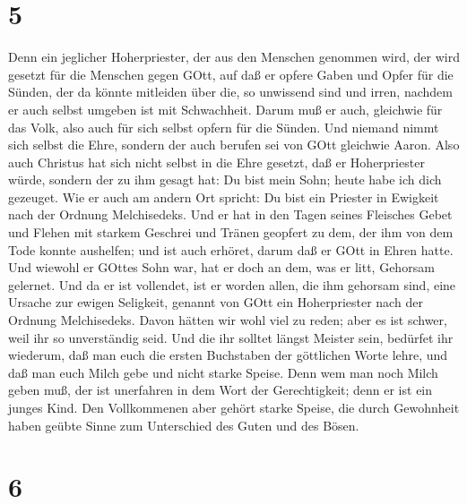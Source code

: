 \hypertarget{section-3}{%
\section{5}\label{section-3}}

 Denn ein jeglicher Hoherpriester, der aus den Menschen
genommen wird, der wird gesetzt für die Menschen gegen GOtt, auf daß er
opfere Gaben und Opfer für die Sünden,  der da könnte
mitleiden über die, so unwissend sind und irren, nachdem er auch selbst
umgeben ist mit Schwachheit.  Darum muß er auch, gleichwie
für das Volk, also auch für sich selbst opfern für die Sünden.
 Und niemand nimmt sich selbst die Ehre, sondern der auch
berufen sei von GOtt gleichwie Aaron.  Also auch Christus
hat sich nicht selbst in die Ehre gesetzt, daß er Hoherpriester würde,
sondern der zu ihm gesagt hat: Du bist mein Sohn; heute habe ich dich
gezeuget.  Wie er auch am andern Ort spricht: Du bist ein
Priester in Ewigkeit nach der Ordnung Melchisedeks.  Und er
hat in den Tagen seines Fleisches Gebet und Flehen mit starkem Geschrei
und Tränen geopfert zu dem, der ihm von dem Tode konnte aushelfen; und
ist auch erhöret, darum daß er GOtt in Ehren hatte.  Und
wiewohl er GOttes Sohn war, hat er doch an dem, was er litt, Gehorsam
gelernet.  Und da er ist vollendet, ist er worden allen, die
ihm gehorsam sind, eine Ursache zur ewigen Seligkeit, 
genannt von GOtt ein Hoherpriester nach der Ordnung Melchisedeks.
 Davon hätten wir wohl viel zu reden; aber es ist schwer,
weil ihr so unverständig seid.  Und die ihr solltet längst
Meister sein, bedürfet ihr wiederum, daß man euch die ersten Buchstaben
der göttlichen Worte lehre, und daß man euch Milch gebe und nicht starke
Speise.  Denn wem man noch Milch geben muß, der ist
unerfahren in dem Wort der Gerechtigkeit; denn er ist ein junges Kind.
 Den Vollkommenen aber gehört starke Speise, die durch
Gewohnheit haben geübte Sinne zum Unterschied des Guten und des Bösen.

\hypertarget{section-4}{%
\section{6}\label{section-4}}

